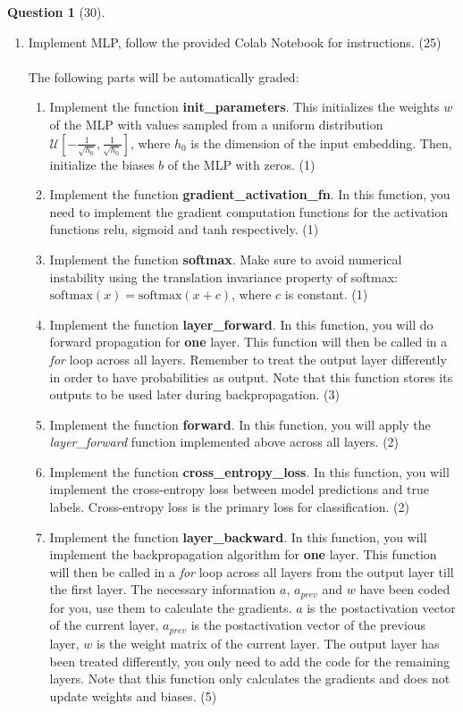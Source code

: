 \documentclass[12pt]{article}
\theoremstyle{definition}
\newtheorem{exercise}{Question}%
\begin{document}
\begin{exercise}[30]
{\begin{enumerate}[label=(\theexercise.\arabic*)]
    \vspace{0.3cm}
    \item Implement MLP, follow the provided Colab Notebook for instructions. (25) \\ \\
    The following parts will be automatically graded:
    \begin{enumerate}
        \item Implement the function \textbf{init\_parameters}. This initializes the weights $w$ of the MLP with values sampled from a uniform distribution $\mathcal{U}\left[-\frac{1}{\sqrt{h_0}}, \frac{1}{\sqrt{h_0}}\right]$, where $h_0$ is the dimension of the input embedding. Then, initialize the biases $b$ of the MLP with zeros. (1) 
        \item Implement the function \textbf{gradient\_activation\_fn}. In this function, you need to implement the gradient computation functions for the activation functions relu, sigmoid and tanh respectively. (1)
        \item Implement the function \textbf{softmax}. Make sure to avoid numerical instability using the translation invariance property of softmax: $\text{softmax}(x) = \text{softmax}(x + c)$, where $c$ is constant. (1)
        \item Implement the function \textbf{layer\_forward}. In this function, you will do forward propagation for \textbf{one} layer. This function will then be called in a \textit{for} loop across all layers. Remember to treat the output layer differently in order to have probabilities as output. Note that this function stores its outputs to be used later during backpropagation. (3)
        \item Implement the function \textbf{forward}. In this function, you will apply the \textit{layer\_forward} function implemented above across all layers. (2)
        \item Implement the function \textbf{cross\_entropy\_loss}. In this function, you will implement the cross-entropy loss between model predictions and true labels. Cross-entropy loss is the primary loss for classification. (2)
        \item Implement the function \textbf{layer\_backward}. In this function, you will implement the backpropagation algorithm for \textbf{one} layer. This function will then be called in a \textit{for} loop across all layers from the output layer till the first layer. The necessary information $a$, $a_{prev}$ and $w$ have been coded for you, use them to calculate the gradients. $a$ is the postactivation vector of the current layer, $a_{prev}$ is the postactivation vector of the previous layer, $w$ is the weight matrix of the current layer. The output layer has been treated differently, you only need to add the code for the remaining layers. Note that this function only calculates the gradients and does not update weights and biases. (5)

\end{enumerate}
\end{enumerate}}
\end{exercise}
\end{document}
